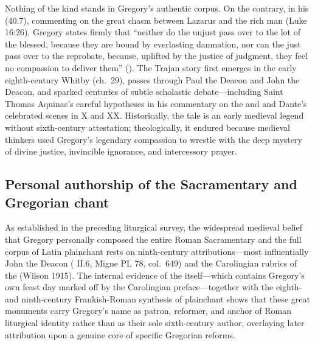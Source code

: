 Nothing of the kind stands in Gregory's authentic corpus. On the contrary, in
his  (40.7), commenting on the great
chasm between Lazarus and the rich man (Luke 16:26), Gregory states firmly
that ``neither do the unjust pass over to the lot of the blessed, because they
are bound by everlasting damnation, nor can the just pass over to the
reprobate, because, uplifted by the justice of judgment, they feel no
compassion to deliver them'' (). The Trajan story first
emerges in the early eighth-century Whitby  (ch.\ 29), passes
through Paul the Deacon and John the Deacon, and sparked centuries of subtle
scholastic debate---including Saint Thomas Aquinas's careful hypotheses in his
commentary on the  and  and Dante's
celebrated scenes in  X and  XX. Historically,
the tale is an early medieval legend without sixth-century attestation;
theologically, it endured because medieval thinkers used Gregory's legendary
compassion to wrestle with the deep mystery of divine justice, invincible
ignorance, and intercessory prayer.

\subsection{Personal authorship of the Sacramentary and Gregorian chant}

As established in the preceding liturgical survey, the widespread medieval
belief that Gregory personally composed the entire Roman Sacramentary and the
full corpus of Latin plainchant rests on ninth-century attributions---most
influentially John the Deacon ( II.6, Migne PL 78, col.\ 649) and
the Carolingian rubrics of the  (Wilson 1915). The internal
evidence of the  itself---which contains Gregory's own feast
day marked off by the Carolingian  preface---together with the
eighth- and ninth-century Frankish-Roman synthesis of plainchant shows that
these great monuments carry Gregory's name as patron, reformer, and anchor of
Roman liturgical identity rather than as their sole sixth-century author,
overlaying later attribution upon a genuine core of specific Gregorian reforms.
